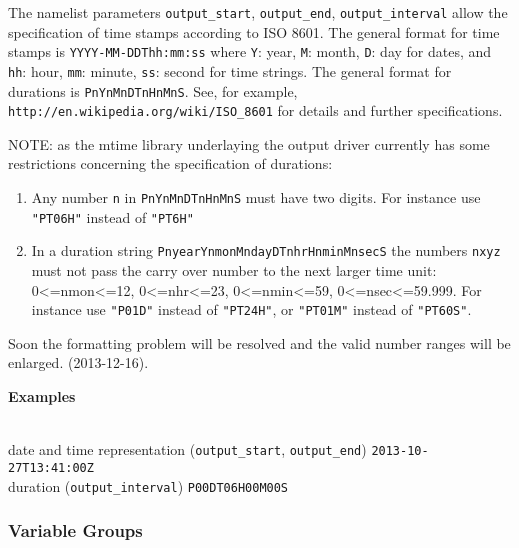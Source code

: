 The namelist parameters \texttt{output\_start}, \texttt{output\_end}, \texttt{output\_interval} allow
the specification of time stamps according to ISO 8601.
The general format for time stamps is \texttt{YYYY-MM-DDThh:mm:ss}
where \texttt{Y}: year, \texttt{M}: month, \texttt{D}: day for dates, 
and   \texttt{hh}: hour, \texttt{mm}: minute, \texttt{ss}: second for time strings.  
The general format for durations is \texttt{PnYnMnDTnHnMnS}.
See, for example, \texttt{http://en.wikipedia.org/wiki/ISO\_8601} for details and further specifications.

\color{red}NOTE: as the mtime library underlaying the output driver
  currently has some restrictions concerning the specification of durations:\begin{enumerate}
\item Any number \texttt{n} in \texttt{PnYnMnDTnHnMnS} must have two digits. For instance use \texttt{"PT06H"} instead of \texttt{"PT6H"}
\item In a duration string \texttt{PnyearYnmonMndayDTnhrHnminMnsecS} the numbers \texttt{nxyz} must not pass the carry over number to the next larger time unit: 0<=nmon<=12, 0<=nhr<=23, 0<=nmin<=59, 0<=nsec<=59.999. For instance use \texttt{"P01D"} instead of \texttt{"PT24H"}, or \texttt{"PT01M"} instead of \texttt{"PT60S"}.
\end{enumerate}

Soon the formatting problem will be resolved and the valid number ranges will be enlarged.
(2013-12-16).\color{black}

\begin{tabbing}
  \parbox{0.7\textwidth}{\textbf{Examples}} \= \\
  date and time representation (\texttt{output\_start}, \texttt{output\_end}) \>
  \texttt{2013-10-27T13:41:00Z} \\
  duration (\texttt{output\_interval}) \>
  \texttt{P00DT06H00M00S} \\
\end{tabbing}



\subsubsection*{Variable Groups}
